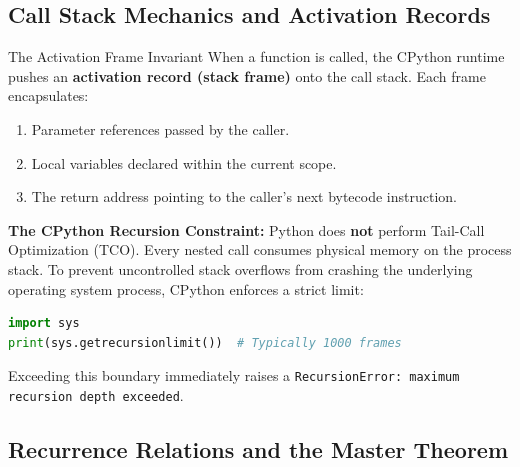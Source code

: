 \subsection{Call Stack Mechanics and Activation Records}

\begin{definitionbox}{The Activation Frame Invariant}
 
When a function is called, the CPython runtime pushes an \textbf{activation record (stack frame)} onto the call stack. Each frame encapsulates:
\begin{enumerate}
    \item Parameter references passed by the caller.
    \item Local variables declared within the current scope.
    \item The return address pointing to the caller's next bytecode instruction.
\end{enumerate}
\textbf{The CPython Recursion Constraint:} Python does \textbf{not} perform Tail-Call Optimization (TCO). Every nested call consumes physical memory on the process stack.
To prevent uncontrolled stack overflows from crashing the underlying operating system process, CPython enforces a strict limit:
\begin{lstlisting}[language=Python]
import sys
print(sys.getrecursionlimit())  # Typically 1000 frames
\end{lstlisting}
Exceeding this boundary immediately raises a \texttt{RecursionError: maximum recursion depth exceeded}.
\end{definitionbox}

\subsection{Recurrence Relations and the Master Theorem}

